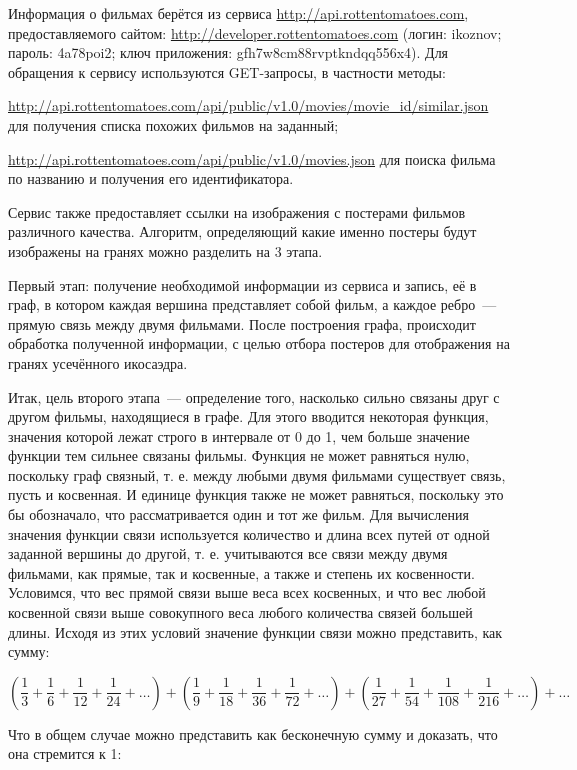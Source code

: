 \documentclass[oneside,final,12pt]{extreport}
\begin{document}
	
Информация о фильмах берётся из сервиса \url{http://api.rottentomatoes.com}, предоставляемого сайтом: \url{http://developer.rottentomatoes.com} (логин: ikoznov; пароль: 4a78poi2; ключ приложения: gfh7w8cm88rvptkndqq556x4). Для обращения к сервису используются GET-запросы, в частности методы:
	
\url{http://api.rottentomatoes.com/api/public/v1.0/movies/movie_id/similar.json} для получения списка похожих фильмов на заданный;

\url{http://api.rottentomatoes.com/api/public/v1.0/movies.json} для поиска фильма по названию и получения его идентификатора.

Сервис также предоставляет ссылки на изображения с постерами фильмов различного качества. Алгоритм, определяющий какие именно постеры будут изображены на гранях можно разделить на 3 этапа.

Первый этап: получение необходимой информации из сервиса и запись, её в граф, в котором каждая вершина представляет собой фильм, а каждое ребро~--- прямую связь между двумя фильмами. После построения графа, происходит обработка полученной информации, с целью отбора постеров для отображения на гранях усечённого икосаэдра.

Итак, цель второго этапа~--- определение того, насколько сильно связаны друг с другом фильмы, находящиеся в графе. Для этого вводится некоторая функция, значения которой лежат строго в интервале от 0 до 1, чем больше значение функции тем сильнее связаны фильмы. Функция не может равняться нулю, поскольку граф связный, т. е. между любыми двумя фильмами существует связь, пусть и косвенная. И единице функция также не может равняться, поскольку это бы обозначало, что рассматривается один и тот же фильм. Для вычисления значения функции связи используется количество и длина всех путей от одной заданной вершины до другой, т. е. учитываются все связи между двумя фильмами, как прямые, так и косвенные, а также и степень их косвенности. Условимся, что вес прямой связи выше веса всех косвенных, и что вес любой косвенной связи выше совокупного веса любого количества связей большей длины. Исходя из этих условий значение функции связи можно представить, как сумму:

\[
\left ( \frac{1}{3} + \frac{1}{6} + \frac{1}{12} + \frac{1}{24} + \ldots \right ) +
\left ( \frac{1}{9} + \frac{1}{18} + \frac{1}{36} + \frac{1}{72} + \ldots \right ) +
\left ( \frac{1}{27} + \frac{1}{54} + \frac{1}{108} + \frac{1}{216} + \ldots \right ) + \ldots
\]

Что в общем случае можно представить как бесконечную сумму и доказать, что она стремится к 1:
\end{document}
